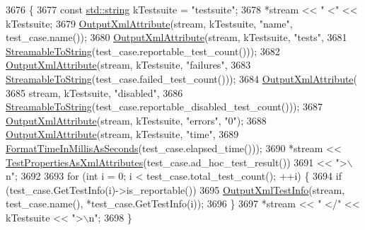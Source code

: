 \begin{DoxyCode}
3676                                                                            \{
3677   \textcolor{keyword}{const} \hyperlink{namespacetesting_1_1internal_a8e8ff5b11e64078831112677156cb111}{std::string} kTestsuite = \textcolor{stringliteral}{"testsuite"};
3678   *stream << \textcolor{stringliteral}{"  <"} << kTestsuite;
3679   \hyperlink{classtesting_1_1internal_1_1XmlUnitTestResultPrinter_aa8ca7066de948d26d171597430c75839}{OutputXmlAttribute}(stream, kTestsuite, \textcolor{stringliteral}{"name"}, test\_case.name());
3680   \hyperlink{classtesting_1_1internal_1_1XmlUnitTestResultPrinter_aa8ca7066de948d26d171597430c75839}{OutputXmlAttribute}(stream, kTestsuite, \textcolor{stringliteral}{"tests"},
3681                      \hyperlink{namespacetesting_1_1internal_aad4beed95d0846e6ffc5da0978ef3bb9}{StreamableToString}(test\_case.reportable\_test\_count()));
3682   \hyperlink{classtesting_1_1internal_1_1XmlUnitTestResultPrinter_aa8ca7066de948d26d171597430c75839}{OutputXmlAttribute}(stream, kTestsuite, \textcolor{stringliteral}{"failures"},
3683                      \hyperlink{namespacetesting_1_1internal_aad4beed95d0846e6ffc5da0978ef3bb9}{StreamableToString}(test\_case.failed\_test\_count()));
3684   \hyperlink{classtesting_1_1internal_1_1XmlUnitTestResultPrinter_aa8ca7066de948d26d171597430c75839}{OutputXmlAttribute}(
3685       stream, kTestsuite, \textcolor{stringliteral}{"disabled"},
3686       \hyperlink{namespacetesting_1_1internal_aad4beed95d0846e6ffc5da0978ef3bb9}{StreamableToString}(test\_case.reportable\_disabled\_test\_count()));
3687   \hyperlink{classtesting_1_1internal_1_1XmlUnitTestResultPrinter_aa8ca7066de948d26d171597430c75839}{OutputXmlAttribute}(stream, kTestsuite, \textcolor{stringliteral}{"errors"}, \textcolor{stringliteral}{"0"});
3688   \hyperlink{classtesting_1_1internal_1_1XmlUnitTestResultPrinter_aa8ca7066de948d26d171597430c75839}{OutputXmlAttribute}(stream, kTestsuite, \textcolor{stringliteral}{"time"},
3689                      \hyperlink{namespacetesting_1_1internal_a904485f27a54be8a5a92856e2d838797}{FormatTimeInMillisAsSeconds}(test\_case.elapsed\_time()));
3690   *stream << \hyperlink{classtesting_1_1internal_1_1XmlUnitTestResultPrinter_aaac4f1352a2cc46f6a69994d45999f0b}{TestPropertiesAsXmlAttributes}(test\_case.ad\_hoc\_test\_result())
3691           << \textcolor{stringliteral}{">\(\backslash\)n"};
3692 
3693   \textcolor{keywordflow}{for} (\textcolor{keywordtype}{int} i = 0; i < test\_case.total\_test\_count(); ++i) \{
3694     \textcolor{keywordflow}{if} (test\_case.GetTestInfo(i)->is\_reportable())
3695       \hyperlink{classtesting_1_1internal_1_1XmlUnitTestResultPrinter_af642843faed4cd28c77d688f6f2820d7}{OutputXmlTestInfo}(stream, test\_case.name(), *test\_case.GetTestInfo(i));
3696   \}
3697   *stream << \textcolor{stringliteral}{"  </"} << kTestsuite << \textcolor{stringliteral}{">\(\backslash\)n"};
3698 \}
\end{DoxyCode}
